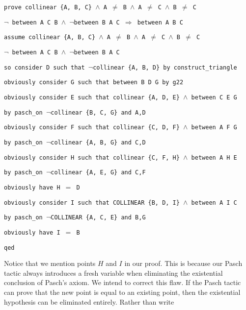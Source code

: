 \vspace{0.5cm}
\begin{minipage}{\linewidth}
  \footnotesize 
  \noindent\texttt{prove collinear \{A, B, C\} $\wedge$ A $\neq$ B $\wedge$ A $\neq$ C $\wedge$ B $\neq$ C}

  \texttt{\qquad\qquad$\neg$ between A C B $\wedge$ $\neg$between B A C $\Longrightarrow$ between A B C}

  \texttt{assume collinear \{A, B, C\} $\wedge$ A $\neq$ B $\wedge$ A $\neq$ C $\wedge$ B $\neq$ C}

  \texttt{\qquad\qquad $\neg$ between A C B $\wedge$ $\neg$between B A C}

  \texttt{so consider D such that $\neg$collinear \{A, B, D\} by construct\_triangle}

  \texttt{obviously consider G such that between B D G by g22}

  \texttt{obviously consider E such that collinear \{A, D, E\} $\wedge$ between C E G}

  \texttt{\qquad\qquad by pasch\_on $\neg$collinear \{B, C, G\} and A,D}

  \texttt{obviously consider F such that collinear \{C, D, F\} $\wedge$ between A F G}

  \texttt{\qquad\qquad by pasch\_on $\neg$collinear \{A, B, G\} and C,D}

  \texttt{obviously consider H such that collinear \{C, F, H\} $\wedge$ between A H E}

  \texttt{\qquad\qquad by pasch\_on $\neg$collinear \{A, E, G\} and C,F}

  \texttt{obviously have H $=$ D}

  \texttt{obviously consider I such that COLLINEAR \{B, D, I\} $\wedge$ between A I C}

  \texttt{\qquad\qquad by pasch\_on $\neg$COLLINEAR \{A, C, E\} and B,G}

  \texttt{obviously have I $=$ B}

  \texttt{qed}
\end{minipage}
\vspace{0.5cm}

Notice that we mention points $H$ and $I$ in our proof. This is because our Pasch tactic always introduces a fresh variable when eliminating the existential conclusion of Pasch's axiom. We intend to correct this flaw. If the Pasch tactic can prove that the new point is equal to an existing point, then the existential hypothesis can be eliminated entirely. Rather than write

